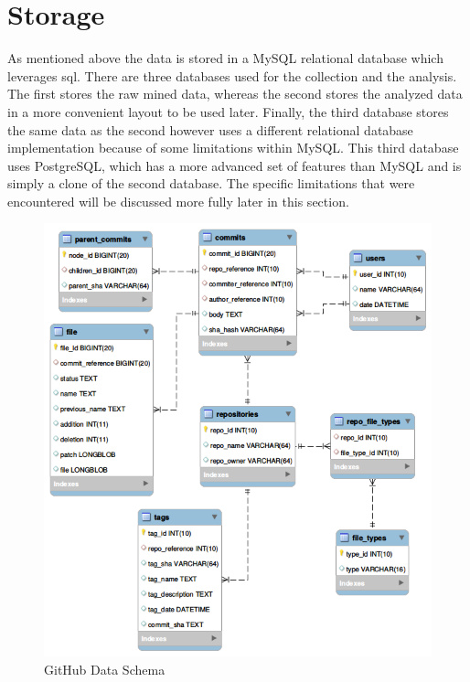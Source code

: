 
\section{Storage}
\label{sec:storage}

As mentioned above the data is stored in a MySQL relational database which leverages \gls{sql}. There are three databases used for the collection and the analysis. The first stores the raw mined data, whereas the second stores the analyzed data in a more convenient layout to be used later. Finally, the third database stores the same data as the second however uses a different relational database implementation because of some limitations within MySQL. This third database uses PostgreSQL, which has a more advanced set of features than MySQL and is simply a clone of the second database. The specific limitations that were encountered will be discussed more fully later in this section.

\begin{figure}[!ht]
    \centering
        \includegraphics[width=1.0\textwidth]{images/github_data_schema}
    \caption{GitHub Data Schema}
    \label{fig:github_data_schema}
\end{figure}

